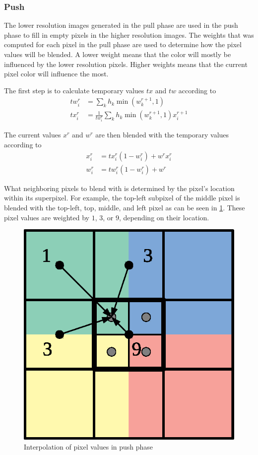 \begin{subs}
\subsubsection{Push}
The lower resolution images generated in the pull phase are used in the push phase to fill in empty pixels in the higher resolution images. The weights that was computed for each pixel in the pull phase are used to determine how the pixel values will be blended. A lower weight means that the color will mostly be influenced by the lower resolution pixels. Higher weights means that the current pixel color will influence the most.

The first step is to calculate temporary values $tx$ and $tw$ according to
\begin{align}
  tw^{r}_i &= \sum_k {h_k \min(w^{r+1}_k,1)} \label{eq:push_tw}\\
  tx^{r}_i &= \frac{1}{tw^{r}_i} \sum_k {h_k \min(w^{r+1}_k,1) x^{r+1}_i} \label{eq:push_tx}
\end{align}

The current values $x^r$ and $w^r$ are then blended with the temporary values according to
\begin{align}
  x^r_i &= tx^r_i (1 - w^r_i) + w^r x^r_i \label{eq:push_x}\\
  w^r_i &= tw^r_i (1 - w^r_i) + w^r \label{eq:push_w}
\end{align}

What neighboring pixels to blend with is determined by the pixel's location within its superpixel. For example, the top-left subpixel of the middle pixel is blended with the top-left, top, middle, and left pixel as can be seen in \cref{fig:push_filter}. These pixel values are weighted by $1$, $3$, or $9$,  depending on their location.

\begin{figure}[h]
    \centering
    \includegraphics[width=.5\textwidth]{figures/push_filter_color.eps}
    \caption{Interpolation of pixel values in push phase}
    \label{fig:push_filter}
\end{figure}

\end{subs}

